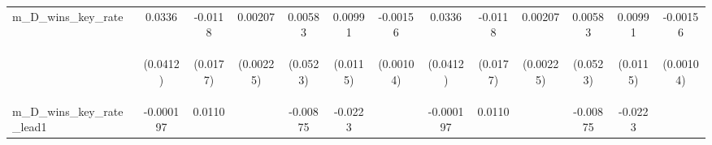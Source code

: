 \documentclass[]{article}
\begin{document}
\begin{center}
\begin{tabular}{lcccccccccccc}
m\_D\_wins\_key\_rate & 0.0336 & -0.0118 & 0.00207 & 0.00583 & 0.00991 & -0.00156 & 0.0336 & -0.0118 & 0.00207 & 0.00583 & 0.00991 & -0.00156 \\
\vspace{4pt} & \begin{footnotesize}(0.0412)\end{footnotesize} & \begin{footnotesize}(0.0177)\end{footnotesize} & \begin{footnotesize}(0.00225)\end{footnotesize} & \begin{footnotesize}(0.0523)\end{footnotesize} & \begin{footnotesize}(0.0115)\end{footnotesize} & \begin{footnotesize}(0.00104)\end{footnotesize} & \begin{footnotesize}(0.0412)\end{footnotesize} & \begin{footnotesize}(0.0177)\end{footnotesize} & \begin{footnotesize}(0.00225)\end{footnotesize} & \begin{footnotesize}(0.0523)\end{footnotesize} & \begin{footnotesize}(0.0115)\end{footnotesize} & \begin{footnotesize}(0.00104)\end{footnotesize} \\
m\_D\_wins\_key\_rate\_lead1 & -0.000197 & 0.0110 &  & -0.00875 & -0.0223 &  & -0.000197 & 0.0110 &  & -0.00875 & -0.0223 &  \\

\end{tabular}
\end{center}
\end{document}
